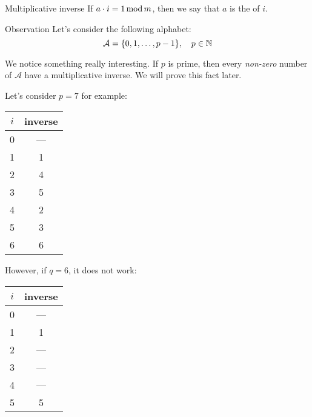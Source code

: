 \documentclass[a4paper]{article}
\begin{document}
\begin{parag}{Multiplicative inverse}
    If $a \cdot i = 1 \operatorname{mod} m$, then we say that $a$ is the  of $i$.

    \begin{subparag}{Observation}
        Let's consider the following alphabet:
        \[\mathcal{A} = \left\{0, 1, \ldots, p-1\right\}, \mathspace p \in \mathbb{N}\]

        We notice something really interesting. If $p$ is prime, then every \textit{non-zero} number of $\mathcal{A}$ have a multiplicative inverse. We will prove this fact later.

        Let's consider $p = 7$ for example:
        \begin{center}
        \begin{tabular}{c|c}
            $i$ & inverse \\
            \hline
            0 & --- \\
            1 & 1 \\
            2 & 4 \\
            3 & 5 \\
            4 & 2 \\
            5 & 3 \\
            6 & 6
        \end{tabular}
        \end{center}

        However, if $q = 6$, it does not work:
        \begin{center}
        \begin{tabular}{c|c}
            $i$ & inverse \\
            \hline
            0 & --- \\
            1 & 1 \\
            2 & --- \\
            3 & --- \\
            4 & --- \\
            5 & 5 \\
        \end{tabular}
        \end{center}
    \end{subparag}
\end{parag}
\end{document}
